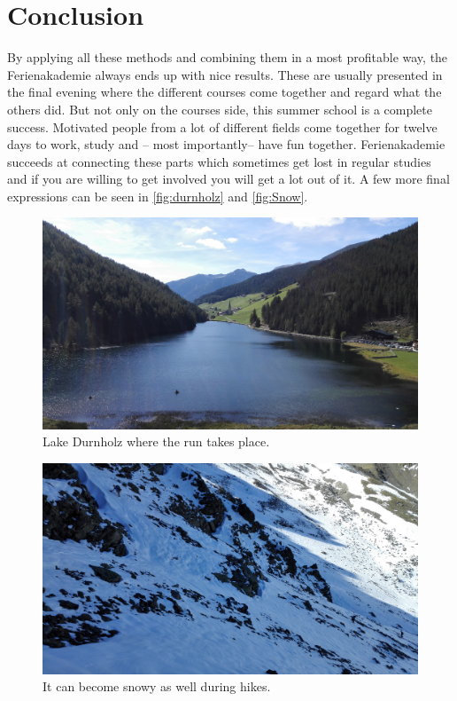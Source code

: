 \section{Conclusion}
By applying all these methods and combining them in a most profitable way, the Ferienakademie always ends up with nice results. These are usually presented in the final evening where the different courses come together and regard what the others did. But not only on the courses side, this summer school is a complete success. Motivated people from a lot of different fields come together for twelve days to work, study and -- most importantly-- have fun together. Ferienakademie succeeds at connecting these parts which sometimes get lost in regular studies and if you are willing to get involved you will get a lot out of it. A few more final expressions can be seen in \autoref{fig:durnholz} and \autoref{fig:Snow}.
\begin{figure}[ht]%
 	\begin{center}%
 		\includegraphics[scale=0.05]{img/Durnholz.jpg}%
 		\caption{Lake Durnholz where the run takes place.}\label{fig:durnholz}%
 	\end{center}%
\end{figure}
\begin{figure}[ht]%
 	\begin{center}%
 		\includegraphics[scale=0.05]{img/Snow.jpg}%
 		\caption{It can become snowy as well during hikes.}\label{fig:Snow}%
 	\end{center}%
\end{figure}